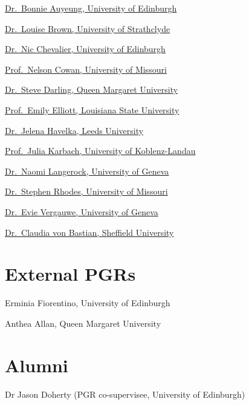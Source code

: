 \documentclass[12pt,]{book}
\theoremstyle{definition}
\theoremstyle{definition}
\theoremstyle{definition}
\theoremstyle{remark}
\begin{document}
\href{https://www.ed.ac.uk/profile/bonnie-auyeung}{Dr.~Bonnie Auyeung,
University of Edinburgh}

\href{https://www.strath.ac.uk/staff/brownlouisedr/}{Dr.~Louise Brown,
University of Strathclyde}

\href{https://www.ed.ac.uk/profile/nicolas-chevalier}{Dr.~Nic Chevalier,
University of Edinburgh}

\href{http://memory.psych.missouri.edu/cowan.shtml}{Prof.~Nelson Cowan,
University of Missouri}

\href{https://www.qmu.ac.uk/schools-and-divisions/psychology-and-sociology/psychology-and-sociology-staff/dr-stephen-darling/}{Dr.~Steve
Darling, Queen Margaret University}

\href{https://www.lsu.edu/hss/psychology/faculty/cognitive/elliott.php}{Prof.~Emily
Elliott, Louisiana State University}

\href{https://medhealth.leeds.ac.uk/profile/1300/956/jelena_havelka}{Dr.~Jelena
Havelka, Leeds University}

\href{https://www.uni-koblenz-landau.de/en/campus-landau/fb8/entwicklungspsychologie-und-padagogische-psychologie-en/team/prof-julia-karbach}{Prof.~Julia
Karbach, University of Koblenz-Landau}

\href{https://www.unige.ch/fapse/decopsy/group/patrick/}{Dr.~Naomi
Langerock, University of Geneva}

\href{https://psychology.missouri.edu/people/rhodes}{Dr.~Stephen Rhodes,
University of Missouri}

\href{https://www.unige.ch/fapse/decopsy/group/evie/}{Dr.~Evie Vergauwe,
University of Geneva}

\href{https://www.sheffield.ac.uk/psychology/staff/academic/claudia-von_bastian}{Dr.~Claudia
von Bastian, Sheffield University}

\section{External PGRs}\label{external-pgrs}

Erminia Fiorentino, University of Edinburgh

Anthea Allan, Queen Margaret University

\section{Alumni}\label{alumni}

Dr Jason Doherty (PGR co-supervisee, University of Edinburgh)
\end{document}
